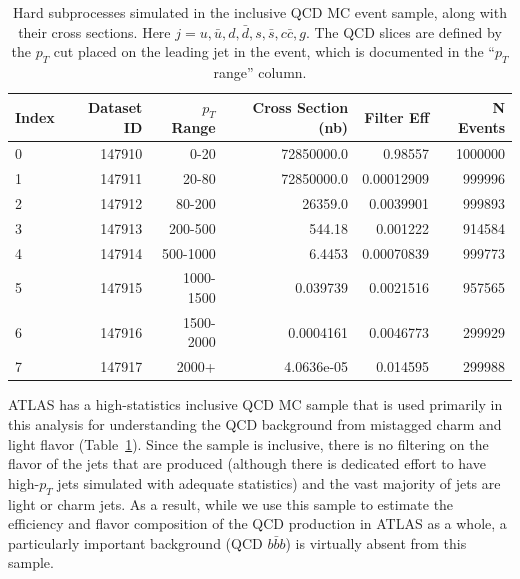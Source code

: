 \begin{table}[h]
 \begin{center}
\caption{Hard subprocesses simulated in the inclusive QCD MC event sample, along with their cross sections. Here
$j=u,\bar{u},d,\bar{d},s,\bar{s},c\bar{c},g$.  The QCD slices are defined by the $p_T$ cut placed
on the leading jet in the event, which is documented in the ``$p_T$ range'' column.
\label{tab:qcd_mc_parameters}}
    \begin{tabular}{l r r r r r} \hline \hline
    Index & Dataset ID & $p_T$ Range& Cross Section (nb)& Filter Eff   & N Events \\ \hline
    0     &  147910    & 0-20        &  72850000.0       &      0.98557 & 1000000 \\
    1     &  147911    & 20-80       &  72850000.0       &   0.00012909 & 999996  \\
    2     &  147912    & 80-200      &     26359.0       &    0.0039901 & 999893 \\
    3     &  147913    & 200-500     &      544.18       &     0.001222 & 914584 \\
    4     &  147914    & 500-1000    &      6.4453       &   0.00070839 & 999773 \\
    5     &  147915    & 1000-1500   &    0.039739       &    0.0021516 & 957565 \\
    6     &  147916    & 1500-2000   &   0.0004161       &    0.0046773 & 299929 \\
    7     &  147917    & 2000+       &  4.0636e-05       &     0.014595 & 299988 \\ \hline
    \end{tabular}
  \end{center}
\end{table}

ATLAS has a high-statistics inclusive QCD MC sample that is used primarily in 
this analysis for understanding the QCD background from 
mistagged charm and light flavor (Table~\ref{tab:qcd_mc_parameters}).  Since 
the sample is inclusive, there is no filtering on the flavor of the jets 
that are produced (although there is dedicated effort to have high-$p_T$ 
jets simulated with adequate statistics) and the vast majority of jets are light or 
charm jets.  As a result, while we use this sample to estimate the 
efficiency and flavor composition of the QCD production in ATLAS as a whole, a 
particularly important background (QCD $b\bar{b}b$) is virtually absent from this sample.


